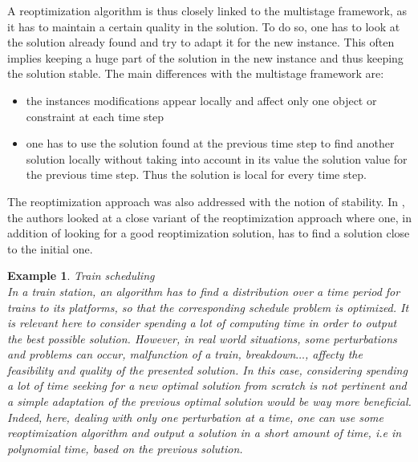 \documentclass[a4paper]{book}
\newtheorem{ex}{Example}[chapter]
\begin{document}
A reoptimization algorithm is thus closely linked to the multistage framework, as it has to maintain a certain quality in the solution. To do so, one has to look at the solution already found and try to adapt it for the new instance. This often implies keeping a huge part of the solution in the new instance and thus keeping the solution stable. The main differences with the multistage framework are:
\begin{itemize}
    \item the instances modifications appear locally and affect only one object or constraint at each time step
    \item one has to use the solution found at the previous time step to find another solution locally without taking into account in its value the solution value for the previous time step. Thus the solution is local for every time step.
\end{itemize} 

The reoptimization approach was also addressed with the notion of stability. In \cite{CohenCDL16}, the authors looked at a close variant of the reoptimization approach where one, in addition of looking for a good reoptimization solution, has to find a solution close to the initial one. 

\begin{ex}
Train scheduling \\
In a train station, an algorithm has to find a distribution over a time period for trains to its platforms, so that the corresponding schedule problem is optimized. It is relevant here to consider spending a lot of computing time in order to output the best possible solution. However, in real world situations, some perturbations and problems can occur, malfunction of a train, breakdown$\ldots$, affecty the feasibility and quality of the presented solution. In this case, considering spending a lot of time seeking for a new optimal solution from scratch is not pertinent and a simple adaptation of the previous optimal solution would be way more beneficial. Indeed, here, dealing with only one perturbation at a time, one can use some reoptimization algorithm and output a solution in a short amount of time, i.e in polynomial time, based on the previous solution.

\end{ex}
\end{document}
